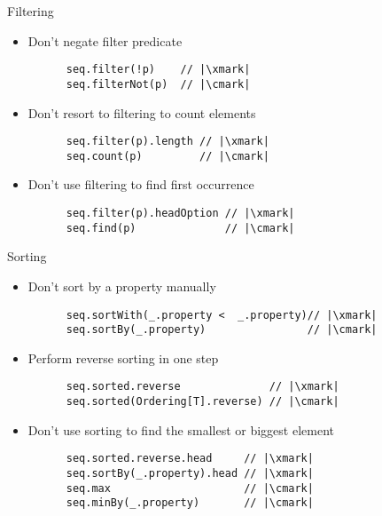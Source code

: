 \documentclass[aspectratio=169]{beamer}
\begin{document}
\begin{frame}[fragile]{Filtering}
  \begin{itemize}
    \item Don’t negate filter predicate\\
      \begin{verbatim}
      seq.filter(!p)    // |\xmark|
      seq.filterNot(p)  // |\cmark|
      \end{verbatim}
      \pause
    \item Don’t resort to filtering to count elements\\
      \begin{verbatim}
      seq.filter(p).length // |\xmark|
      seq.count(p)         // |\cmark|
      \end{verbatim}
      \pause
    \item Don’t use filtering to find first occurrence\\
      \begin{verbatim}
      seq.filter(p).headOption // |\xmark|
      seq.find(p)              // |\cmark|
      \end{verbatim}
  \end{itemize}
\end{frame}

\begin{frame}[fragile]{Sorting}
  \begin{itemize}
    \item Don’t sort by a property manually\\
      \begin{verbatim}
      seq.sortWith(_.property <  _.property)// |\xmark|
      seq.sortBy(_.property)                // |\cmark|
      \end{verbatim}
      \pause
    \item Perform reverse sorting in one step\\
      \begin{verbatim}
      seq.sorted.reverse              // |\xmark|
      seq.sorted(Ordering[T].reverse) // |\cmark|
      \end{verbatim}
      \pause
    \item Don’t use sorting to find the smallest or biggest element\\
      \begin{verbatim}
      seq.sorted.reverse.head     // |\xmark|
      seq.sortBy(_.property).head // |\xmark|
      seq.max                     // |\cmark|
      seq.minBy(_.property)       // |\cmark|
      \end{verbatim}
  \end{itemize}
\end{frame}
\end{document}

